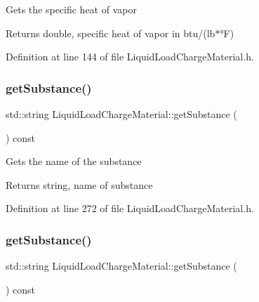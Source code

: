 Gets the specific heat of vapor \begin{DoxyReturn}{Returns}
double, specific heat of vapor in btu/(lb$\ast$°F) 
\end{DoxyReturn}


Definition at line 144 of file Liquid\+Load\+Charge\+Material.\+h.

\mbox{\label{class_liquid_load_charge_material_a8f925c04c15ed889ba3fd7c4b628dbff}} 
\subsubsection{\texorpdfstring{get\+Substance()}{getSubstance()}\hspace{0.1cm}{\footnotesize\ttfamily [1/3]}}
{\footnotesize\ttfamily std\+::string Liquid\+Load\+Charge\+Material\+::get\+Substance (\begin{DoxyParamCaption}{ }\end{DoxyParamCaption}) const\hspace{0.3cm}{\ttfamily [inline]}}

Gets the name of the substance \begin{DoxyReturn}{Returns}
string, name of substance 
\end{DoxyReturn}


Definition at line 272 of file Liquid\+Load\+Charge\+Material.\+h.

\mbox{\label{class_liquid_load_charge_material_a8f925c04c15ed889ba3fd7c4b628dbff}} 
\subsubsection{\texorpdfstring{get\+Substance()}{getSubstance()}\hspace{0.1cm}{\footnotesize\ttfamily [2/3]}}
{\footnotesize\ttfamily std\+::string Liquid\+Load\+Charge\+Material\+::get\+Substance (\begin{DoxyParamCaption}{ }\end{DoxyParamCaption}) const\hspace{0.3cm}{\ttfamily [inline]}}

